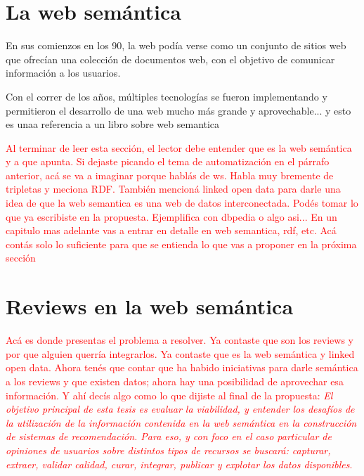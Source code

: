 \section{La web semántica}
\label{section:la-web-semantica}
En sus comienzos en los 90, la web podía verse como un conjunto de sitios web que ofrecían una colección de documentos web, con el objetivo de comunicar información a los usuarios.

Con el correr de los años, múltiples tecnologías se fueron implementando y permitieron el desarrollo de una web mucho más grande y aprovechable...  y esto es unaa referencia a un libro sobre web semantica \cite{Antoniou2004}

\begin{framed}
\textcolor{red}{Al terminar de leer esta sección, el lector debe entender que es la web semántica y a que apunta. Si dejaste picando el tema de automatización en el párrafo anterior, acá se va a imaginar porque hablás de ws. Habla muy bremente de tripletas y meciona RDF. También mencioná linked open data para darle una idea de que la web semantica es una web de datos interconectada. Podés tomar lo que ya escribiste en la propuesta. Ejemplifica con dbpedia o algo asi... En un capitulo mas adelante vas a entrar en detalle en web semantica, rdf, etc. Acá contás solo lo suficiente para que se entienda lo que vas a proponer en la próxima sección}
\end{framed}

\section{Reviews en la web semántica}
\label{section:reviews-en-la-web}

\begin{framed}
\textcolor{red}{Acá es donde presentas el problema a resolver. Ya contaste que son los reviews y por que alguien querría integrarlos. Ya contaste que es la web semántica y linked open data. Ahora tenés que contar que ha habido iniciativas para darle semántica a los reviews y que existen datos; ahora hay una posibilidad de aprovechar esa información. Y ahí decís algo como lo que dijiste al final de la propuesta: \textit{El objetivo principal de esta tesis es evaluar la viabilidad, y entender los desafíos de la utilización de la información contenida en la web semántica en la construcción de sistemas de recomendación. Para eso, y con foco en el caso particular de opiniones de usuarios sobre distintos tipos de recursos se buscará: capturar, extraer, validar calidad, curar, integrar, publicar y explotar los datos disponibles}.}
\end{framed}

